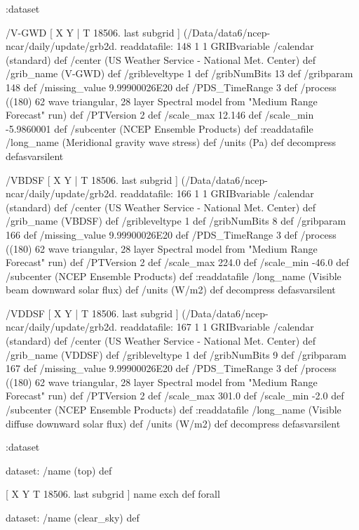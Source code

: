\begin{ingrid}
  :dataset

  /V-GWD { [ X Y | T 18506. last subgrid ] (/Data/data6/ncep-ncar/daily/update/grb2d.%
  readdatafile:
  148 1 1 GRIBvariable
  /calendar (standard) def
  /center (US Weather Service - National Met. Center) def
  /grib_name (V-GWD) def
  /gribleveltype 1 def
  /gribNumBits 13 def
  /gribparam 148 def
  /missing_value 9.99900026E20 def
  /PDS_TimeRange 3 def
  /process ((180) 62 wave triangular, 28 layer Spectral model from "Medium Range Forecast" run) def
  /PTVersion 2 def
  /scale_max 12.146 def
  /scale_min -5.9860001 def
  /subcenter (NCEP Ensemble Products) def
  :readdatafile
  /long_name (Meridional gravity wave stress) def
  /units (Pa) def
  decompress
  } defasvarsilent

  /VBDSF { [ X Y | T 18506. last subgrid ] (/Data/data6/ncep-ncar/daily/update/grb2d.%
  readdatafile:
  166 1 1 GRIBvariable
  /calendar (standard) def
  /center (US Weather Service - National Met. Center) def
  /grib_name (VBDSF) def
  /gribleveltype 1 def
  /gribNumBits 8 def
  /gribparam 166 def
  /missing_value 9.99900026E20 def
  /PDS_TimeRange 3 def
  /process ((180) 62 wave triangular, 28 layer Spectral model from "Medium Range Forecast" run) def
  /PTVersion 2 def
  /scale_max 224.0 def
  /scale_min -46.0 def
  /subcenter (NCEP Ensemble Products) def
  :readdatafile
  /long_name (Visible beam downward solar flux) def
  /units (W/m2) def
  decompress
  } defasvarsilent

  /VDDSF { [ X Y | T 18506. last subgrid ] (/Data/data6/ncep-ncar/daily/update/grb2d.%
  readdatafile:
  167 1 1 GRIBvariable
  /calendar (standard) def
  /center (US Weather Service - National Met. Center) def
  /grib_name (VDDSF) def
  /gribleveltype 1 def
  /gribNumBits 9 def
  /gribparam 167 def
  /missing_value 9.99900026E20 def
  /PDS_TimeRange 3 def
  /process ((180) 62 wave triangular, 28 layer Spectral model from "Medium Range Forecast" run) def
  /PTVersion 2 def
  /scale_max 301.0 def
  /scale_min -2.0 def
  /subcenter (NCEP Ensemble Products) def
  :readdatafile
  /long_name (Visible diffuse downward solar flux) def
  /units (W/m2) def
  decompress
  } defasvarsilent

 :dataset  %

 dataset: /name (top) def

  [ X Y T 18506. last subgrid ] { name exch def } forall

  dataset: /name (clear_sky) def


\end{ingrid}
